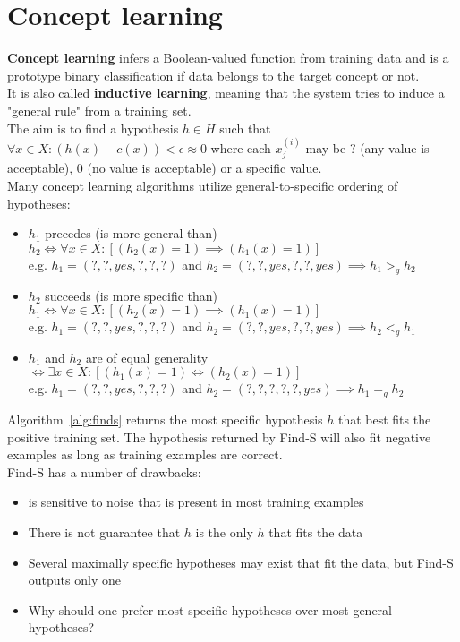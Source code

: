 \documentclass{report}
\begin{document}
\section{Concept learning}
{\bf Concept learning} infers a Boolean-valued function from training data and is a prototype binary classification if data belongs to the target concept or not.
\\
It is also called {\bf inductive learning}, meaning that the system tries to induce a "general rule" from a training set.
\\
The aim is to find a hypothesis $h\in H$ such that $\forall x\in X: (h(x) - c(x)) < \epsilon \approx 0$ where each $x^{(i)}_j$ may be $?$ (any value is acceptable), $0$ (no value is acceptable) or a specific value.
\\
Many concept learning algorithms utilize general-to-specific ordering of hypotheses:
\begin{itemize}
\item $h_1$ precedes (is more general than) $h_2 \iff \forall x\in X: [(h_2(x)=1)\implies (h_1(x)=1)]$ \\
e.g. $h_1 = (?,?,yes,?,?,?)$ and $h_2 = (?,?,yes,?,?,yes) \implies h_1 >_g h_2$
\item $h_2$ succeeds (is more specific than) $h_1 \iff \forall x\in X: [(h_2(x)=1)\implies (h_1(x)=1)]$ \\
e.g. $h_1 = (?,?,yes,?,?,?)$ and $h_2 = (?,?,yes,?,?,yes)  \implies h_2 <_g h_1$
\item $h_1$ and $h_2$ are of equal generality $\iff \exists x\in X: [(h_1(x)=1)\iff (h_2(x)=1)]$ \\
e.g. $h_1 = (?,?,yes,?,?,?)$ and $h_2 = (?,?,?,?,?,yes) \implies h_1 =_g h_2$
\end{itemize}

Algorithm~\ref{alg:finds} returns the most specific hypothesis $h$ that best fits the positive training set. The hypothesis returned by Find-S will also fit negative examples as long as training examples are correct.
\\
Find-S has a number of drawbacks:
\begin{itemize}
\item is sensitive to noise that is present in most training examples
\item There is not guarantee that $h$ is the only $h$ that fits the data
\item Several maximally specific hypotheses may exist that fit the data, but Find-S outputs only one
\item Why should one prefer most specific hypotheses over most general hypotheses?
\end{itemize}
\end{document}
